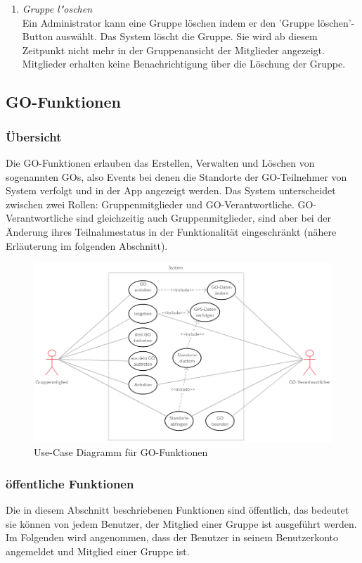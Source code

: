 \documentclass[parskip=full]{scrartcl}
\def\threedigits#1{%
  \ifnum#1<100 0\fi
  \ifnum#1<10 0\fi
  \number#1}
\begin{document}
\begin{enumerate}[label={\textbf{/F\protect\threedigits{\theenumi}0/}}, leftmargin=*, resume]
	\item \textit{Gruppe l"oschen}\label{Gruppe löschen} \\
	Ein Administrator kann eine Gruppe löschen indem er den 'Gruppe löschen'-Button auswählt. Das System löscht die Gruppe. Sie wird ab diesem Zeitpunkt nicht mehr in der Gruppenansicht der Mitglieder angezeigt. Mitglieder erhalten keine Benachrichtigung über die Löschung der Gruppe.
	
\end{enumerate}
	
\subsection{GO-Funktionen}

\subsubsection{Übersicht}
Die GO-Funktionen erlauben das Erstellen, Verwalten und Löschen von sogenannten GOs, also Events bei denen die Standorte der \gls{GO-Teilnehmer} von System verfolgt und in der App angezeigt werden. Das System unterscheidet zwischen zwei Rollen: Gruppenmitglieder und GO-Verantwortliche. GO-Verantwortliche sind gleichzeitig auch Gruppenmitglieder, sind aber bei der Änderung ihres Teilnahmestatus in der Funktionalität eingeschränkt (nähere Erläuterung im folgenden Abschnitt).

	\begin{figure}[H]
		\centering
		\includegraphics[width=1\textwidth]{Use_Cases/use_case_GO.png}
		\caption{Use-Case Diagramm für GO-Funktionen}
	\end{figure}

 

\subsubsection{öffentliche Funktionen}
Die in diesem Abschnitt beschriebenen Funktionen sind öffentlich, das bedeutet sie können von jedem Benutzer, der Mitglied einer Gruppe ist ausgeführt werden.
Im Folgenden wird angenommen, dass der Benutzer in seinem Benutzerkonto angemeldet und Mitglied einer Gruppe ist.
\end{document}
